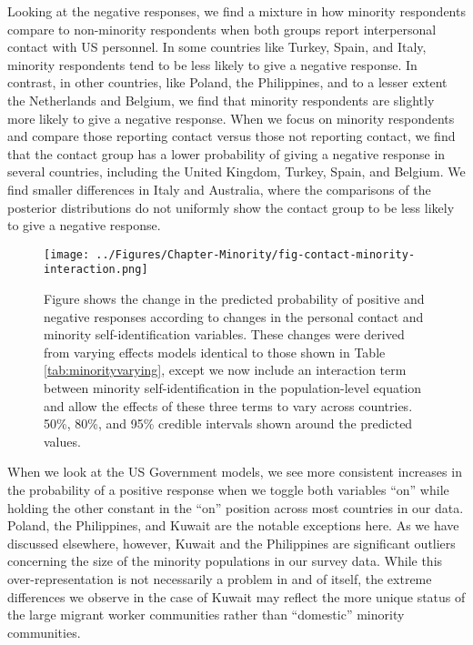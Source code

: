 Looking at the negative responses, we find a mixture in how minority respondents compare to non-minority respondents when both groups report interpersonal contact with US personnel. In some countries like Turkey, Spain, and Italy, minority respondents tend to be less likely to give a negative response. In contrast, in other countries, like Poland, the Philippines, and to a lesser extent the Netherlands and Belgium, we find that minority respondents are slightly more likely to give a negative response. When we focus on minority respondents and compare those reporting contact versus those not reporting contact, we find that the contact group has a lower probability of giving a negative response in several countries, including the United Kingdom, Turkey, Spain, and Belgium. We find smaller differences in Italy and Australia, where the comparisons of the posterior distributions do not uniformly show the contact group to be less likely to give a negative response.

\begin{figure}[t!]
	\centering\texttt{[image: ../Figures/Chapter-Minority/fig-contact-minority-interaction.png]}
	\caption{Figure shows the change in the predicted probability of positive and negative responses according to changes in the personal contact and minority self-identification variables. These changes were derived from varying effects models identical to those shown in Table \ref{tab:minorityvarying}, except we now include an interaction term between minority self-identification in the population-level equation and allow the effects of these three terms to vary across countries. 50\%, 80\%, and 95\% credible intervals shown around the predicted values.}
	\label{fig:minorityinteractionvaryingeffect}
\end{figure}

When we look at the US Government models, we see more consistent increases in the probability of a positive response when we toggle both variables ``on'' while holding the other constant in the ``on'' position across most countries in our data. Poland, the Philippines, and Kuwait are the notable exceptions here. As we have discussed elsewhere, however, Kuwait and the Philippines are significant outliers concerning the size of the minority populations in our survey data. While this over-representation is not necessarily a problem in and of itself, the extreme differences we observe in the case of Kuwait may reflect the more unique status of the large migrant worker communities rather than ``domestic'' minority communities.

